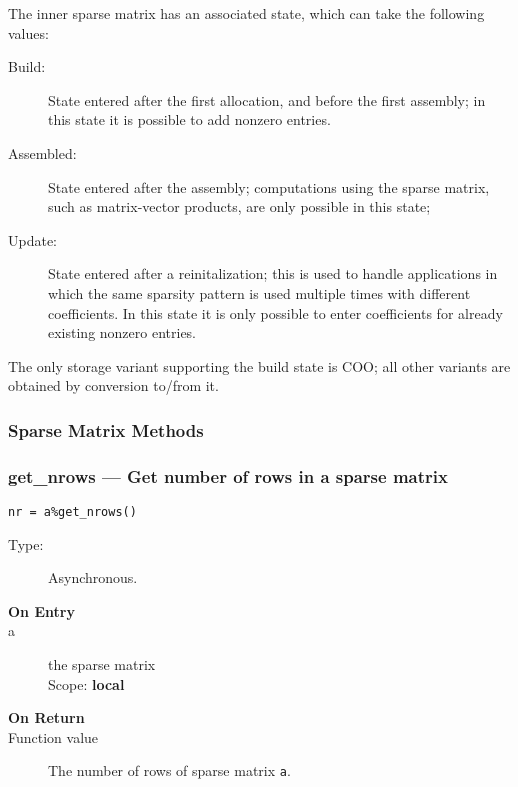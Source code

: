 The inner sparse matrix has an associated state, which can take the
following values:
\begin{description}
\item[Build:] State entered after the first allocation, and before the
  first assembly; in this state it is possible to add nonzero entries.
\item[Assembled:] State entered after the assembly; computations using
  the sparse matrix, such as matrix-vector products, are only possible
  in this state;
\item[Update:] State entered after a reinitalization; this is used to
  handle applications in which the same sparsity pattern is used
  multiple times with different coefficients. In this state it is only
  possible to enter coefficients for already existing nonzero entries.
\end{description}
The only storage variant supporting the build state is COO; all other
variants are obtained by conversion to/from it. 

\subsubsection{Sparse Matrix Methods}

\subsubsection{get\_nrows --- Get number of  rows in a sparse  matrix}

\begin{verbatim}
nr = a%get_nrows()
\end{verbatim}

\begin{description}
\item[Type:] Asynchronous.
\item[\bf On Entry]
\item[a] the sparse matrix\\
Scope: {\bf local}\\
\end{description}

\begin{description}
\item[\bf On Return]
\item[Function value] The number of  rows  of sparse matrix \verb|a|.
\end{description}


